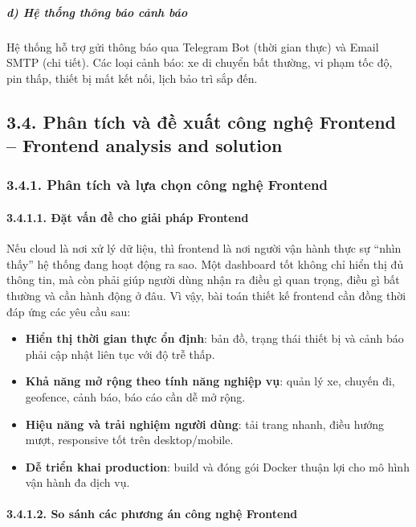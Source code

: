 \documentclass[a4paper]{extarticle}
\providecommand{\tightlist}{%
  \setlength{\itemsep}{0pt}\setlength{\parskip}{0pt}}
\begin{document}
\subparagraph{d) Hệ thống thông báo cảnh
báo}\label{d-hux1ec7-thux1ed1ng-thuxf4ng-buxe1o-cux1ea3nh-buxe1o}

Hệ thống hỗ trợ gửi thông báo qua Telegram Bot (thời gian thực) và Email
SMTP (chi tiết). Các loại cảnh báo: xe di chuyển bất thường, vi phạm tốc
độ, pin thấp, thiết bị mất kết nối, lịch bảo trì sắp đến.

\subsection{3.4. Phân tích và đề xuất công nghệ Frontend -- Frontend
analysis and solution}\label{34-phan-tich-va-de-xuat-cong-nghe-frontend}

\subsubsection{3.4.1. Phân tích và lựa chọn công nghệ Frontend}

\paragraph{3.4.1.1. Đặt vấn đề cho giải pháp
Frontend}\label{3141-ux111ux1eb7t-vux1ea5n-ux111ux1ec1-cho-giux1ea3i-phuxe1p-frontend}

Nếu cloud là nơi xử lý dữ liệu, thì frontend là nơi người vận hành thực
sự ``nhìn thấy'' hệ thống đang hoạt động ra sao. Một dashboard tốt không
chỉ hiển thị đủ thông tin, mà còn phải giúp người dùng nhận ra điều gì
quan trọng, điều gì bất thường và cần hành động ở đâu. Vì vậy, bài toán
thiết kế frontend cần đồng thời đáp ứng các yêu cầu sau:

\begin{itemize}
\tightlist
\item
  \textbf{Hiển thị thời gian thực ổn định}: bản đồ, trạng thái thiết bị
  và cảnh báo phải cập nhật liên tục với độ trễ thấp.
\item
  \textbf{Khả năng mở rộng theo tính năng nghiệp vụ}: quản lý xe, chuyến
  đi, geofence, cảnh báo, báo cáo cần dễ mở rộng.
\item
  \textbf{Hiệu năng và trải nghiệm người dùng}: tải trang nhanh, điều
  hướng mượt, responsive tốt trên desktop/mobile.
\item
  \textbf{Dễ triển khai production}: build và đóng gói Docker thuận lợi
  cho mô hình vận hành đa dịch vụ.
\end{itemize}

\paragraph{3.4.1.2. So sánh các phương án công nghệ
Frontend}\label{3142-so-suxe1nh-cuxe1c-phux1b0ux1a1ng-uxe1n-cuxf4ng-nghux1ec7-frontend}
\end{document}
